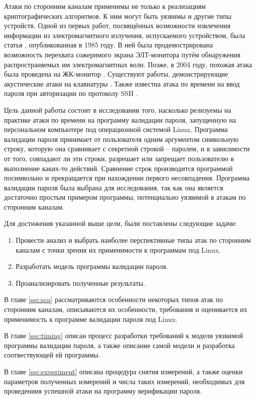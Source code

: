 Атаки по сторонним каналам применимы не только к реализациям криптографических
алгоритмов. К ним могут быть уязвимы и другие типы устройств. Одной из первых
работ, посвящённых возможности извлечения информации из электромагнитного
излучения, испускаемого устройством, была статья \cite{van-eck}, опубликованная
в 1985 году. В ней была продемострирована возможность перехвата сожеримого
экрана ЭЛТ-монитора путём обнаружения распространяемых им электромагнитных волн.
Позже, в 2004 году, похожая атака была проведена на ЖК-монитор \cite{kuhn}.
Существуют работы, демонстрирующие акустические атаки на клавиатуры
\cite{asonov} \cite{zhuang}. Также известна атака по времени на ввод пароля
при авторизации по протоколу SSH \cite{ssh}.

Цель данной работы состоит в исследовании того, насколько релизуемы на практике
атаки по времени на программу валидации пароля, запущенную на персональном
компьютере под операционной системой Linux. Программа валидации пароля
принимает от пользователя одним аргументом символьную строку, которую она
сравнивает с секретной строкой -- паролем, и в зависимости от того, совпадают
ли эти строки, разрешает или запрещает пользователю в выполнение каких-то
действий. Сравнение строк производится программой посимвольно и прекращается
при нахождении первого несовпадения. Программа валидации пароля была выбрана
для исследования, так как она является достаточно простым примером программы,
потенциально уязвимой в атакам по сторонним каналам.

Для достижения указанной выше цели, были поставлены следующие задачи:
\begin{enumerate}
\item Провести анализ и выбрать наиболее перспективные типы атак по сторонним
  каналам с точки зрения их применимости к программам под Linux.
\item Разработать модель программы валидации пароля.
\item Проанализировать полученные результаты.
\end{enumerate}

В главе \ref{sec:sca} рассматриваются особенности некоторых типов атак по
сторонним каналам, описываются их особенности, требования и оценивается
их применимость к программе валидации пароля под Linux.

В главе \ref{sec:timing} описан процесс разработки требований к модели уязвимой
программы валидации пароля, а также описание самой модели и разработка
соотвествующей ей программы.

В главе \ref{sec:experiment} описана процедура снятия измерений, а также оценки
параметров полученных измерений и числа таких измерений, необходимых для
проведениия успешной атаки на программу верификации пароля.

\clearpage
